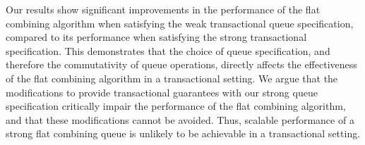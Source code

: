 Our results show significant improvements in the performance of the flat combining algorithm when satisfying the weak transactional queue specification, compared to its performance when satisfying the strong transactional specification. This demonstrates that the choice of queue specification, and therefore the commutativity of queue operations, directly affects the effectiveness of the flat combining algorithm in a transactional setting. We argue that the modifications to provide transactional guarantees with our strong queue specification critically impair the performance of the flat combining algorithm, and that these modifications cannot be avoided. Thus, scalable performance of a strong flat combining queue is unlikely to be achievable in a transactional setting.
